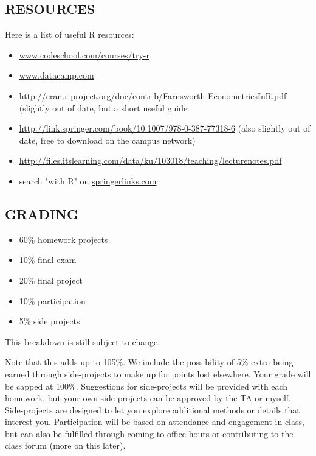 \documentclass{scrartcl}
\begin{document}
\subsection*{RESOURCES}

Here is a list of useful R resources:
\begin{itemize}
\item \href{www.codeschool.com/courses/try-r}{www.codeschool.com/courses/try-r}
\item \href{www.datacamp.com}{www.datacamp.com}
\item \href{http://cran.r-project.org/doc/contrib/Farnsworth-EconometricsInR.pdf}{http://cran.r-project.org/doc/contrib/Farnsworth-EconometricsInR.pdf} (slightly out of date, but a short useful guide
\item \href{http://link.springer.com/book/10.1007/978-0-387-77318-6}{http://link.springer.com/book/10.1007/978-0-387-77318-6} (also slightly out of date, free to download on the campus network)
\item \href{http://files.itslearning.com/data/ku/103018/teaching/lecturenotes.pdf}{http://files.itslearning.com/data/ku/103018/teaching/lecturenotes.pdf}
\item search "with R" on \href{springerlinks.com}{springerlinks.com}
\end{itemize}

\subsection*{GRADING}
\begin{itemize}
\item 60\% homework projects
\item 10\% final exam
\item 20\% final project
\item 10\% participation 
\item 5\% side projects
\end{itemize}

This breakdown is still subject to change. 

Note that this adds up to 105\%. We include the possibility of 5\% extra being earned through side-projects to make up for points lost elsewhere. Your grade will be capped at 100\%. Suggestions for side-projects will be provided with each homework, but your own side-projects can be approved by the TA or myself. Side-projects are designed to let you explore additional methods or details that interest you. Participation will be based on attendance and engagement in class, but can also be fulfilled through coming to office hours or contributing to the class forum (more on this later).
\end{document}
